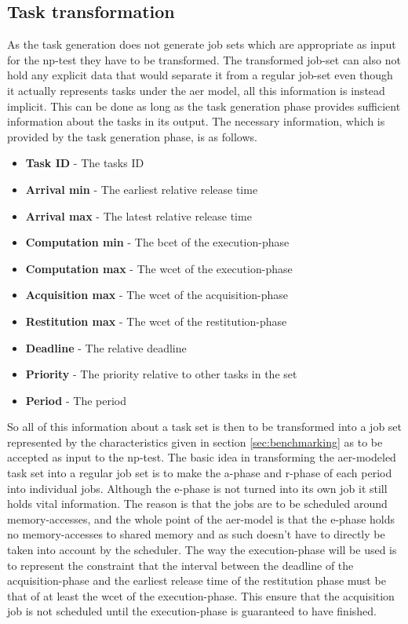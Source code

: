 \documentclass{kththesis}
\begin{document}
\subsection{Task transformation} \label{sub:task_transformation}

As the task generation does not generate job sets which are appropriate as input for the
\acrshort{np}-test they have to be transformed. The transformed job-set can also not hold any
explicit data that would separate it from a regular job-set even though it actually represents tasks
under the \acrshort{aer} model, all this information is instead implicit. This can be done as long
as the task generation phase provides sufficient information about the tasks in its output. The
necessary information, which is provided by the task generation phase, is as follows.

\begin{itemize}
    \item \textbf{Task ID} - The tasks ID
    \item \textbf{Arrival min} - The earliest relative release time
    \item \textbf{Arrival max} - The latest relative release time
    \item \textbf{Computation min} - The \acrshort{bcet} of the execution-phase
    \item \textbf{Computation max} - The \acrshort{wcet} of the execution-phase
    \item \textbf{Acquisition max} - The \acrshort{wcet} of the acquisition-phase
    \item \textbf{Restitution max} - The \acrshort{wcet} of the restitution-phase
    \item \textbf{Deadline} - The relative deadline
    \item \textbf{Priority} - The priority relative to other tasks in the set
    \item \textbf{Period} - The period 
\end{itemize}

So all of this information about a task set is then to be transformed into a job set represented by
the characteristics given in section \ref{sec:benchmarking} as to be accepted as input to the
\acrshort{np}-test. The basic idea in transforming the \acrshort{aer}-modeled task set into a
regular job set is to make the \acrshort{a}-phase and \acrshort{r}-phase of each period into
individual jobs. Although the \acrshort{e}-phase is not turned into its own job it still holds vital
information. The reason is that the jobs are to be scheduled around memory-accesses, and the whole
point of the \acrshort{aer}-model is that the \acrshort{e}-phase holds no memory-accesses to shared
memory and as such doesn't have to directly be taken into account by the scheduler. The way the
execution-phase will be used is to represent the constraint that the interval between the deadline
of the acquisition-phase and the earliest release time of the restitution phase must be that of at
least the \acrshort{wcet} of the execution-phase. This ensure that the acquisition job is not
scheduled until the execution-phase is guaranteed to have finished. 
\end{document}
